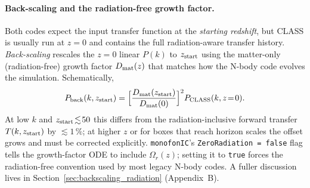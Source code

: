 \documentclass[12pt]{article}
\begin{document}
\paragraph{Back-scaling and the radiation-free growth factor.}
Both codes expect the input transfer function at the \emph{starting
redshift}, but CLASS is usually run at $z=0$ and contains the full
radiation-aware transfer history.  \emph{Back-scaling} rescales the
$z=0$ linear $P(k)$ to $z_{\rm start}$ using the matter-only
(radiation-free) growth factor $D_{\rm mat}(z)$ that matches how the
N-body code evolves the simulation.  Schematically,
%
\begin{equation}
  P_{\rm back}(k, z_{\rm start})
  = \Bigl[\frac{D_{\rm mat}(z_{\rm start})}{D_{\rm mat}(0)}\Bigr]^2
    P_{\rm CLASS}(k, z\!=\!0).
  \label{eq:backscale}
\end{equation}
%
At low $k$ and $z_{\rm start} \!\lesssim\! 50$ this differs from the
radiation-inclusive forward transfer $T(k, z_{\rm start})$ by
$\lesssim\!1\,\%$; at higher $z$ or for boxes that reach horizon
scales the offset grows and must be corrected explicitly.
\texttt{monofonIC}'s \texttt{ZeroRadiation = false} flag tells the
growth-factor ODE to include $\Omega_r(z)$; setting it to \texttt{true}
forces the radiation-free convention used by most legacy N-body
codes.  A fuller discussion lives in
Section~\ref{sec:backscaling_radiation} (Appendix~B).
\end{document}
